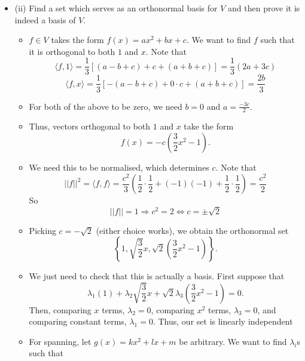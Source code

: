 \documentclass{article}
\begin{document}
\begin{itemize}
\begin{itemize}
\begin{itemize}
            \[
            \left\{ 1, \sqrt{\frac{3}{2}}x \right\}.
            \]
            \item Note that this set is clearly linearly independent since $1$ and $x$ are not proportional to each other, and it clearly spans $U$ since $U$ contains all polynomials fo the form $a+bx$. Therefore, this set is indeed a basis.
        \end{itemize}
        \item (ii) Find a set which serves as an orthonormal basis for $V$ and then prove it is indeed a basis of $V$.
        \begin{itemize}
            \item $f \in V$ takes the form $f(x) = ax^2+bx+c$. We want to find $f$ such that it is orthogonal to both $1$ and $x$. Note that
            \[
            \langle f,1 \rangle = \frac{1}{3}[(a-b+c) + c + (a+b+c)] = \frac{1}{3}(2a+3c)
            \]
            \[
            \langle f,x \rangle = \frac{1}{3} [-(a-b+c)+0\cdot c + (a+b+c)] = \frac{2b}{3}
            \]
            \item For both of the above to be zero, we need $b=0$ and $a=\frac{-3c}{2}$.
            \item Thus, vectors orthogonal to both $1$ and $x$ take the form
            \[
            f(x) = -c\left(\frac{3}{2}x^2 - 1\right).
            \]
            \item We need this to be normalised, which determines $c$. Note that
            \[
            \vert \vert f \vert \vert^2 = \langle f,f \rangle = \frac{c^2}{3} \left( \frac{1}{2}\cdot\frac{1}{2} + (-1)(-1) + \frac{1}{2}\cdot\frac{1}{2} \right) = \frac{c^2}{2}
            \]
            So
            \[
            \vert \vert f \vert \vert = 1 \Longrightarrow c^2 = 2 \Longleftrightarrow c = \pm\sqrt{2}
            \]
            \item Picking $c=-\sqrt{2}$ (either choice works), we obtain the orthonormal set
            \[
            \left\{ 1, \sqrt{\frac{3}{2}}x, \sqrt{2}\left(\frac{3}{2}x^2-1\right) \right\}.
            \]
            \item We just need to check that this is actually a basis. First suppose that
            \[
            \lambda_1(1) + \lambda_2\sqrt{\frac{3}{2}} x + \sqrt{2}\lambda_3 \left(\frac{3}{2}x^2 - 1\right) = 0.
            \]
            Then, comparing $x$ terms, $\lambda_2 = 0$, comparing $x^2$ terms, $\lambda_3 = 0$, and comparing constant terms, $\lambda_1 = 0$. Thus, our set is linearly independent
            \item For spanning, let $g(x) = kx^2 + lx + m$ be arbitrary. We want to find $\lambda_i$s such that

\end{itemize}
\end{itemize}
\end{itemize}
\end{document}
